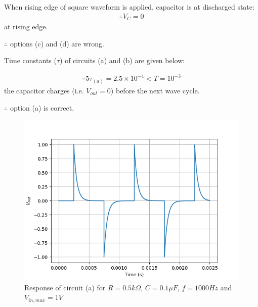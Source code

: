 \documentclass[journal,12pt,twocolumn]{IEEEtran}
\theoremstyle{remark}
\begin{document}
\solution

When rising edge of square waveform is applied, capacitor is at discharged state:
\begin{align}
    \therefore V_C = 0
\end{align}
at rising edge.

$\therefore$ options (c) and (d) are wrong.

Time constants ($\tau$) of circuits (a) and (b) are given below:

\begin{align}
    \because 5\tau_{(a)} = 2.5\times 10^{-4}< T = 10^{-3}
\end{align}
the capacitor charges (i.e. $V_{out} = 0$) before the next wave cycle.

$\therefore$ option (a) is correct.

\begin{figure}[!h]
    \centering
    \includegraphics[width = \columnwidth]{figs/assign4.png}
    \caption{Response of circuit (a) for $R = 0.5k\Omega$, $C = 0.1\mu F$, $f = 1000Hz$ and $V_{in, max} = 1V$}
    \label{fig:enter-label}
\end{figure}
\end{document}
